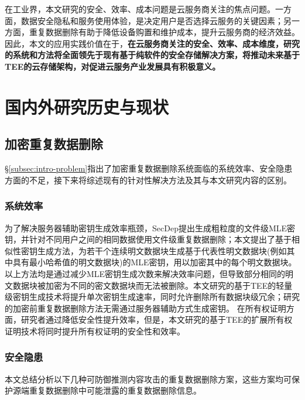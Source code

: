 在工业界，本文研究的安全、效率、成本问题是云服务商关注的焦点问题。一方面，数据安全隐私和服务使用体验，是决定用户是否选择云服务的关键因素；另一方面，重复数据删除有助于降低设备购置和维护成本，提升云服务商的经济效益。因此，本文的应用实践价值在于，\textbf{在云服务商关注的安全、效率、成本维度，研究的系统和方法将全面领先于现有基于纯软件的安全存储解决方案，将推动未来基于TEE的云存储架构，对促进云服务产业发展具有积极意义。}

\section{国内外研究历史与现状}
\label{sec:compare}

\subsection{加密重复数据删除}
\label{subsec:compare-deduplication}

\S\ref{subsec:intro-problem}指出了加密重复数据删除系统面临的系统效率、安全隐患方面的不足，接下来将综述现有的针对性解决方法及其与本文研究内容的区别。

\subsubsection{系统效率}
\label{subsubsec:compare-deduplication-performance}

为了解决服务器辅助密钥生成效率瓶颈，SecDep提出生成粗粒度的文件级MLE密钥，并针对不同用户之间的相同数据使用文件级重复数据删除；本文提出了基于相似性密钥生成方法，为若干个连续明文数据块生成基于代表性明文数据块(例如其中具有最小哈希值的明文数据块)的MLE密钥，用以加密其中的每个明文数据块。以上方法均是通过减少MLE密钥生成次数来解决效率问题，但导致部分相同的明文数据块被加密为不同的密文数据块而无法被删除。本文研究的基于TEE的轻量级密钥生成技术将提升单次密钥生成速率，同时允许删除所有数据块级冗余；研究的加密前重复数据删除方法无需通过服务器辅助方式生成密钥。
在所有权证明方面，研究者通过降低安全性提升效率，但是，本文研究的基于TEE的扩展所有权证明技术将同时提升所有权证明的安全性和效率。

\subsubsection{安全隐患}
\label{subsubsec:compare-deduplication-security}

本文总结分析以下几种可防御推测内容攻击的重复数据删除方案，这些方案均可保护源端重复数据删除中可能泄露的重复数据删除信息。

